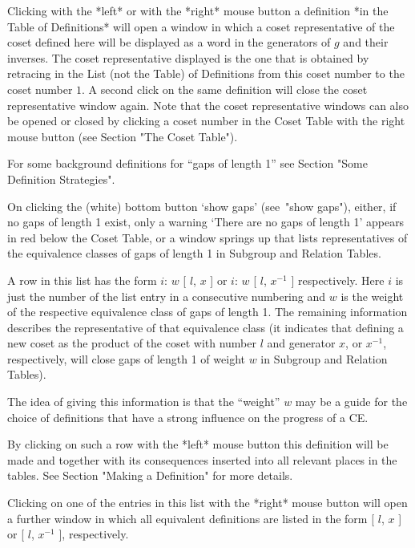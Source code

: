 Clicking with the *left* or with the *right* mouse button a definition
*in the Table of Definitions* will open a window in which a coset
representative of the coset defined here will be displayed as a word
in the generators of $g$ and their inverses. The coset representative
displayed is the one that is obtained by retracing in the List (not
the Table) of Definitions from this coset number to the coset number
$1$. A second click on the same definition will close the coset
representative window again. Note that the coset representative
windows can also be opened or closed by clicking a coset number in
the Coset Table with the right mouse button (see Section "The Coset
Table").



For some background definitions for ``gaps of length 1'' see Section
"Some Definition Strategies".

On clicking the (white) bottom button `show gaps' (see~"show gaps"),
either, if no gaps of length 1 exist, only a warning `There are no
gaps of length 1' appears in red below the Coset Table, or a window
springs up that lists representatives of the equivalence classes of
gaps of length 1 in Subgroup and Relation Tables.

A row in this list has the form $i$: $w$ [ $l$, $x$ ] or $i$: $w$ [
$l$, $x^{-1}$ ] respectively. Here $i$ is just the number of the list
entry in a consecutive numbering and $w$ is the weight of the
respective equivalence class of gaps of length 1. The remaining
information describes the representative of that equivalence class (it
indicates that defining a new coset as the product of the coset with
number $l$ and generator $x$, or $x^{-1}$, respectively, will close
gaps of length 1 of weight $w$ in Subgroup and Relation Tables).

The idea of giving this information is that the ``weight'' $w$ may
be a guide for the choice of definitions that have a strong influence
on the progress of a CE.

By clicking on such a row with the *left* mouse button this definition
will be made and together with its consequences inserted into all
relevant places in the tables. See Section "Making a Definition" for
more details.

Clicking on one of the entries in this list with the *right* mouse
button will open a further window in which all equivalent definitions
are listed in the form [ $l$, $x$ ] or [ $l$, $x^{-1}$ ],
respectively.


